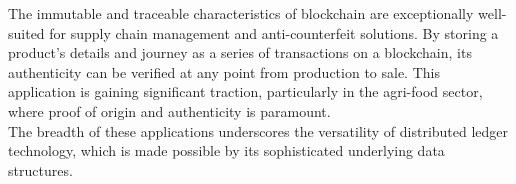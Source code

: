 \documentclass{scrbook}
\begin{document}
The immutable and traceable characteristics of blockchain are exceptionally well-suited for supply chain management and anti-counterfeit solutions. By storing a product's details and journey as a series of transactions on a blockchain, its authenticity can be verified at any point from production to sale. This application is gaining significant traction, particularly in the agri-food sector, where proof of origin and authenticity is paramount. \\

The breadth of these applications underscores the versatility of distributed ledger technology, which is made possible by its sophisticated underlying data structures.
\end{document}

